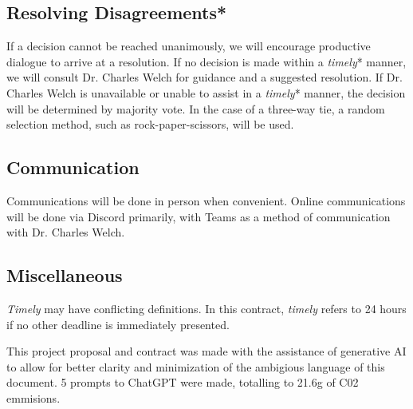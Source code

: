 \documentclass[11pt, letterpaper, notitlepage]{article}
\begin{document}
\subsection{Resolving Disagreements*}




If a decision cannot be reached unanimously, we will encourage productive dialogue to arrive at a resolution. If no decision is made within a \textit{timely}* manner, we will consult Dr. Charles Welch for guidance and a suggested resolution. If Dr. Charles Welch is unavailable or unable to assist in a \textit{timely}* manner, the decision will be determined by majority vote. In the case of a three-way tie, a random selection method, such as rock-paper-scissors, will be used.

\subsection{Communication}

Communications will be done in person when convenient. Online communications will be done via Discord primarily, with Teams as a method of communication with Dr. Charles Welch.

\subsection{Miscellaneous}

\textit{Timely} may have conflicting definitions. In this contract, \textit{timely} refers to 24 hours if no other deadline is immediately presented.

This project proposal and contract was made with the assistance of generative AI to allow for better clarity and minimization of the ambigious  language of this document. 5 prompts to ChatGPT were made, totalling to 21.6g of C02 emmisions.



\newpage
\end{document}
